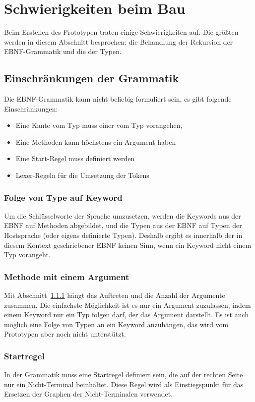 \documentclass[../InterneDSLs.tex]{subfiles}
\begin{document}
\section{Schwierigkeiten beim Bau}
Beim Erstellen des Prototypen traten einige Schwierigkeiten auf. Die größten werden in diesem Abschnitt besprochen: die Behandlung der Rekursion der EBNF-Grammatik und die der Typen.

\subsection{Einschränkungen der Grammatik}
Die EBNF-Grammatik kann nicht beliebig formuliert sein, es gibt folgende Einschränkungen:
\begin{itemize}
	\item Eine Kante vom Typ  muss einer vom Typ  vorangehen,
	\item Eine Methoden kann höchstens ein Argument haben
	\item Eine Start-Regel muss definiert werden
	\item Lexer-Regeln für die Umsetzung der Tokens
\end{itemize}

\subsubsection{Folge von Type auf Keyword}\label{SEC:TypeFollowsKeyword}
Um die Schlüsselworte der Sprache umzusetzen, werden die Keywords aus der EBNF auf Methoden abgebildet, und die Typen aus der EBNF auf Typen der Hostsprache (oder eigens definierte Typen). Deshalb ergibt es innerhalb der in diesem Kontext geschriebener EBNF keinen Sinn, wenn ein Keyword nicht einem Typ vorangeht.

\subsubsection{Methode mit einem Argument}
Mit Abschnitt~\ref{SEC:TypeFollowsKeyword} hängt das Auftreten und die Anzahl der Argumente zusammen. Die einfachste Möglichkeit ist es nur ein Argument zuzulassen, indem einem Keyword nur ein Typ folgen darf, der das Argument darstellt. Es ist auch möglich eine Folge von Typen an ein Keyword anzuhängen, das wird vom Prototypen aber noch nicht unterstützt.

\subsubsection{Startregel}
In der Grammatik muss eine Startregel definiert sein, die auf der rechten Seite nur ein Nicht-Terminal beinhaltet. Diese Regel wird als Einstiegspunkt für das Ersetzen der Graphen der Nicht-Terminalen verwendet.
\end{document}
